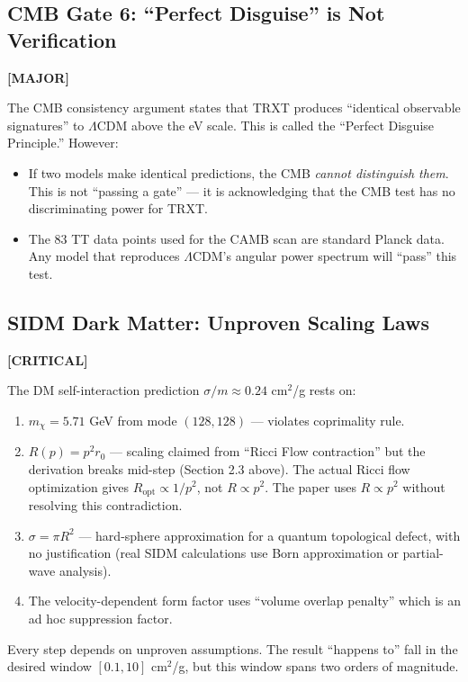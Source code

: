 \documentclass[12pt, a4paper]{article}
\newcommand{\severity}[1]{\textcolor{critical}{\textbf{[CRITICAL]}}}
\newcommand{\major}{\textcolor{major}{\textbf{[MAJOR]}}}
\begin{document}
\subsection{CMB Gate 6: ``Perfect Disguise'' is Not Verification}
\major{}

The CMB consistency argument states that TRXT produces ``identical observable signatures'' to $\Lambda$CDM above the eV scale. This is called the ``Perfect Disguise Principle.'' However:
\begin{itemize}
    \item If two models make identical predictions, the CMB \emph{cannot distinguish them}. This is not ``passing a gate'' --- it is acknowledging that the CMB test has no discriminating power for TRXT.
    \item The 83 TT data points used for the CAMB scan are standard Planck data. Any model that reproduces $\Lambda$CDM's angular power spectrum will ``pass'' this test.
\end{itemize}

\subsection{SIDM Dark Matter: Unproven Scaling Laws}
\severity{C}

The DM self-interaction prediction $\sigma/m \approx 0.24$ cm$^2$/g rests on:
\begin{enumerate}
    \item $m_\chi = 5.71$ GeV from mode $(128, 128)$ --- violates coprimality rule.
    \item $R(p) = p^2 r_0$ --- scaling claimed from ``Ricci Flow contraction'' but the derivation breaks mid-step (Section 2.3 above). The actual Ricci flow optimization gives $R_{\text{opt}} \propto 1/p^2$, not $R \propto p^2$. The paper uses $R \propto p^2$ without resolving this contradiction.
    \item $\sigma = \pi R^2$ --- hard-sphere approximation for a quantum topological defect, with no justification (real SIDM calculations use Born approximation or partial-wave analysis).
    \item The velocity-dependent form factor uses ``volume overlap penalty'' which is an ad hoc suppression factor.
\end{enumerate}

Every step depends on unproven assumptions. The result ``happens to'' fall in the desired window $[0.1, 10]$ cm$^2$/g, but this window spans two orders of magnitude.
\end{document}
